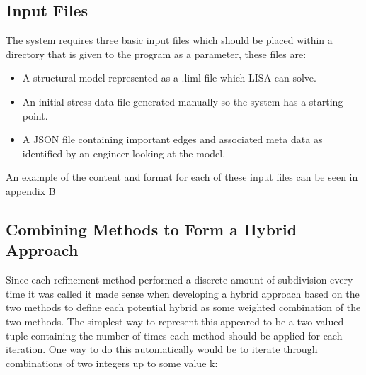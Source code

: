 
\noindent




\subsection{Input Files}
The system requires three basic input files which should be placed within a directory that is given to the program as a parameter, these files are:

\begin{itemize}
\item A structural model represented as a .liml file which LISA can solve.
\item An initial stress data file generated manually so the system has a starting point.
\item A JSON file containing important edges and associated meta data as identified by an engineer looking at the model.
\end{itemize}

An example of the content and format for each of these input files can be seen in appendix B


\subsection{Combining Methods to Form a Hybrid Approach}
Since each refinement method performed a discrete amount of subdivision every time it was called it made sense when developing a hybrid approach based on the two methods to define each potential hybrid as some weighted combination of the two methods. The simplest way to represent this appeared to be a two valued tuple containing the number of times each method should be applied for each iteration. One way to do this automatically would be to iterate through combinations of two integers up to some value k:

